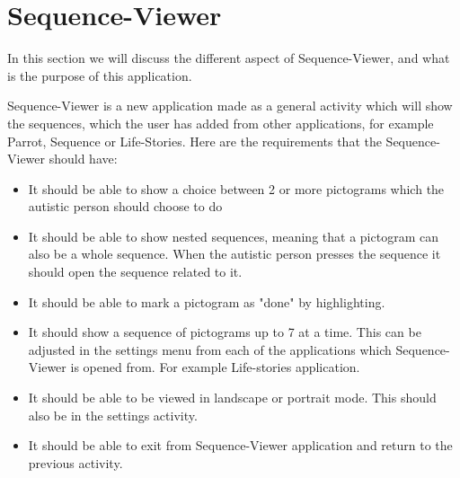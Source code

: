 \section{Sequence-Viewer}
In this section we will discuss the different aspect of Sequence-Viewer, and what is the purpose of this application.

Sequence-Viewer is a new application made as a general activity which will show the sequences, which the user has added from other applications, for example Parrot, Sequence or Life-Stories.
Here are the requirements that the Sequence-Viewer should have:
\begin{itemize}
\item It should be able to show a choice between 2 or more pictograms which the autistic person should choose to do
\item It should be able to show nested sequences, meaning that a pictogram can also be a whole sequence. When the autistic person presses the sequence it should open the sequence related to it.
\item It should be able to mark a pictogram as "done" by highlighting.
\item It should show a sequence of pictograms up to 7 at a time. This can be adjusted in the settings menu from each of the applications which Sequence-Viewer is opened from. For example Life-stories application.
\item It should be able to be viewed in landscape or portrait mode. This should also be in the settings activity.
\item It should be able to exit from Sequence-Viewer application and return to the previous activity.
\end{itemize}
